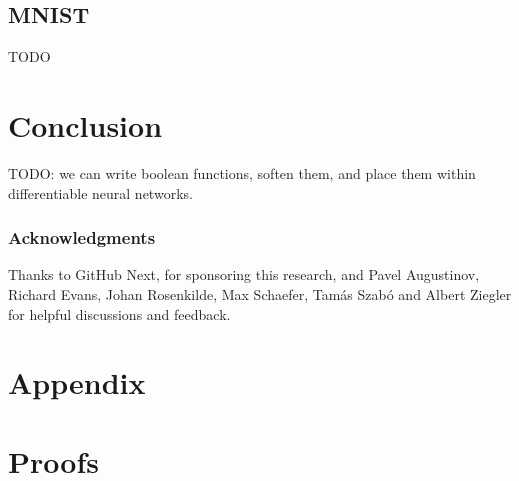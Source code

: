 \documentclass{article} %
\begin{document}
\subsection{MNIST}

TODO

\section{Conclusion}\label{sec:conclusion}

TODO: we can write boolean functions, soften them, and place them within differentiable neural networks.

\subsubsection*{Acknowledgments}
Thanks to GitHub Next, for sponsoring this research, and Pavel Augustinov, Richard Evans, Johan Rosenkilde, Max Schaefer, Tam\'{a}s Szab\'{o} and Albert Ziegler for helpful discussions and feedback.




\newpage

\appendix

\section*{Appendix}

\section{Proofs}
\end{document}
